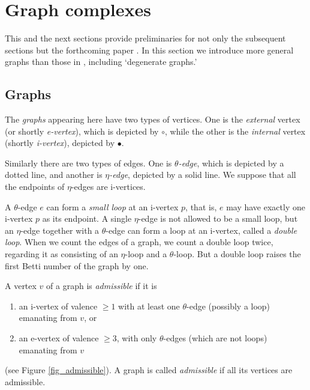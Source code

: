 \section{Graph complexes}\label{section_graph}


This and the next sections provide preliminaries for not only the subsequent sections but the forthcoming paper
\cite{KWatanabe08}.
In this section we introduce more general graphs than those in \cite{CattaneoRossi05, Rossi_thesis, Watanabe07},
including `degenerate graphs.'





\subsection{Graphs}\label{subsection_graph}


The {\em graphs} appearing here have two types of vertices.
One is the {\it external} vertex (or shortly {\it e-vertex}), which is depicted by $\circ$, while the other is the
{\it internal} vertex (shortly {\it i-vertex}), depicted by $\bullet$.


Similarly there are two types of edges.
One is $\theta${\em -edge}, which is depicted by a dotted line, and another is $\eta${\it -edge}, depicted by a
solid line.
We suppose that all the endpoints of $\eta$-edges are i-vertices.

A $\theta$-edge $e$ can form a {\it small loop} at an i-vertex $p$, that is, $e$ may have exactly one i-vertex $p$ as
its endpoint.
A single $\eta$-edge is not allowed to be a small loop, but an $\eta$-edge together with a $\theta$-edge can form
a loop at an i-vertex, called a {\em double loop}.
When we count the edges of a graph, we count a double loop twice, regarding it as consisting of an $\eta$-loop and a
$\theta$-loop.
But a double loop raises the first Betti number of the graph by one.


\begin{defn}\label{def_admissible}
A vertex $v$ of a graph is {\em admissible} if it is
\begin{enumerate}
\item an i-vertex of valence $\ge 1$ with at least one $\theta$-edge (possibly a loop) emanating from $v$, or
\item an e-vertex of valence $\ge 3$, with only $\theta$-edges (which are not loops) emanating from $v$
\end{enumerate}
(see Figure \ref{fig_admissible}).
A graph is called {\em admissible} if all its vertices are admissible.
\end{defn}


